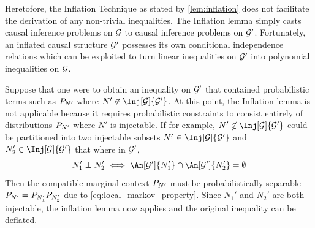 \documentclass[aps, 10pt, english, twoside, pra, nofootinbib, tightenlines, longbibliography, superscriptaddress]{revtex4-1}
\begin{document}
    Heretofore, the Inflation Technique as stated by \cref{lem:inflation} does not facilitate the derivation of any non-trivial inequalities. The Inflation lemma simply casts causal inference problems on $\mathcal{G}$ to causal inference problems on $\mathcal{G}'$. Fortunately, an inflated causal structure $\mathcal{G}'$ possesses its own conditional independence relations which can be exploited to turn linear inequalities on $\mathcal{G}'$ into polynomial inequalities on $\mathcal{G}$.

    Suppose that one were to obtain an inequality on $\mathcal{G}'$ that contained probabilistic terms such as $\prob[N']$ where $N' \not \in \Inj[\graph]{\graph'}$. At this point, the Inflation lemma is not applicable because it requires probabilistic constraints to consist entirely of distributions $\prob[N']$ where $N'$ is injectable. If for example, $N' \not \in \Inj[\graph]{\graph'}$ could be partitioned into two injectable subsets $N_1' \in \Inj[\graph]{\graph'}$ and $N_2' \in \Inj[\graph]{\graph'}$ that where  in $\mathcal{G}'$,
    \[ N_1' \ancestralindep N_2' \iff \An[\graph']{N_1'} \cap \An[\graph']{N_2'}= \emptyset \]
    Then the compatible marginal context $\prob[N']$ must be probabilistically separable $\prob[N'] = \prob[N_1']\prob[N_2']$ due to \cref{eq:local_markov_property}. Since $N_1'$ and $N_2'$ are both injectable, the inflation lemma now applies and the original inequality can be deflated.

    \begin{center}
    \end{center}
\end{document}
